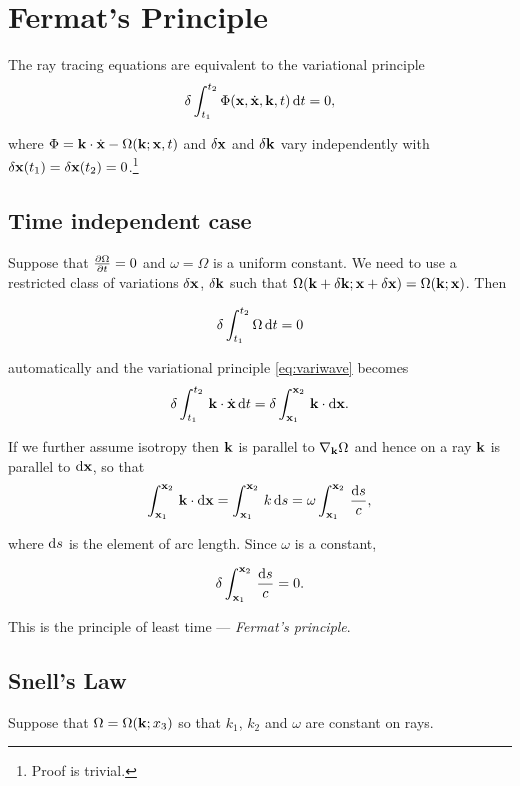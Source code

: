\documentclass{notes}
\newcommand{\vk}{\vect{k}}
\begin{document}
\section{Fermat's Principle}

The ray tracing equations are equivalent to the variational principle
\begin{equation}\label{eq:variwave}
\delta \int_{t_1}^{t_2} \Phi(\vx,\Dot{\vx}, \vk,t)\, \ud t = 0,
\end{equation}

where $\Phi = \vk \cdot \Dot{\vx} - \Omega(\vk;\vx,t)$ and $\delta \mathbf{x}$
and $\delta \vk$ vary independently with $\delta \mathbf{x} (t_1) = \delta \mathbf{x}
(t_2) = 0$.\footnote{Proof is trivial.}

\subsection{Time independent case}

Suppose that $\frac{\partial \Omega}{\partial t} = 0$ and $\omega = \Omega$ is a uniform
constant.  We need to use a restricted class of variations $\delta
\mathbf{x}$, $\delta \vk$ such that $\Omega(\vk + \delta \vk;\vx + \delta \vx) =
\Omega(\vk;\vx)$.  Then

\[
\delta \int_{t_1}^{t_2} \Omega\, \mathrm{d} t = 0
\]

automatically and the variational principle \eqref{eq:variwave}
becomes
\[
\delta \int_{t_1}^{t_2}\, \vk \cdot \Dot{\vx}\, \ud t
= \delta \int_{\vx_1}^{\vx_2}\, \vk \cdot \ud \vx.
\]

If we further assume isotropy then $\vk$ is parallel to $\nabla_\vk
\Omega$ and hence on a ray $\vk$ is parallel to $\mathrm{d} \mathbf{x}$, so that
\[
\int_{\vx_1}^{\vx_2}\, \vk \cdot \ud \vx = \int_{\vx_1}^{\vx_2}\, k\, \ud s
= \omega \int_{\vx_1}^{\vx_2}\, \frac{\ud s}{c},
\]

where $\mathrm{d} s$ is the element of arc length.  Since $\omega$ is a
constant,

\[
\delta \int_{\mathbf{x}_1}^{\mathbf{x}_2}\, \frac{\mathrm{d} s}{c} = 0.
\]

This is the principle of least time --- \emph{Fermat's principle}.

\subsection{Snell's Law}

Suppose that $\Omega = \Omega(\vk;x_3)$ so that
$k_1$, $k_2$ and $\omega$ are constant on rays.

\vspace{1in}
\end{document}
